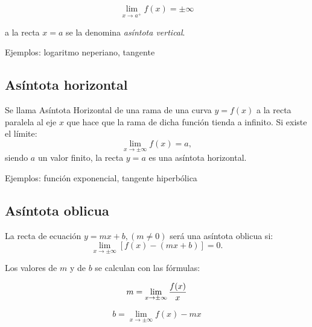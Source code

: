 \documentclass[14pt,a4paper]{extarticle}
\begin{document}
\[ \lim_{x \to a^+} f(x) = \pm\infty \]

a la recta \( x = a \)  se la denomina \emph{as\'intota vertical}.

Ejemplos: logaritmo neperiano, tangente
\subsection{As\'intota horizontal}
Se llama As\'intota Horizontal de una rama de una curva \(  y = f(x) \)  a la recta paralela al eje \( x \)  que hace que la rama de dicha funci\'on tienda a infinito. Si existe el l\'imite:
\[  \lim_{x \to \pm\infty} f(x)= a , \]
siendo \( a \)  un valor finito, la recta \( y = a \)  es una as\'intota horizontal.

Ejemplos: funci\'on exponencial, tangente hiperb\'olica
\subsection{As\'intota oblicua}
La recta de ecuaci\'on \( y = mx + b ,  (m \neq 0) \)  ser\'a una as\'intota oblicua si:
\[ \lim_{x \to \pm\infty}[f(x)-(mx+b)] = 0. \]

Los valores de \( m \)  y de \( b \)  se calculan con las f\'ormulas:

\[ m = \lim_{x \to \pm\infty}{f(x) \over x} \]

\[ b = \lim_{x \to \pm\infty}{f(x)-mx} \]
\end{document}
